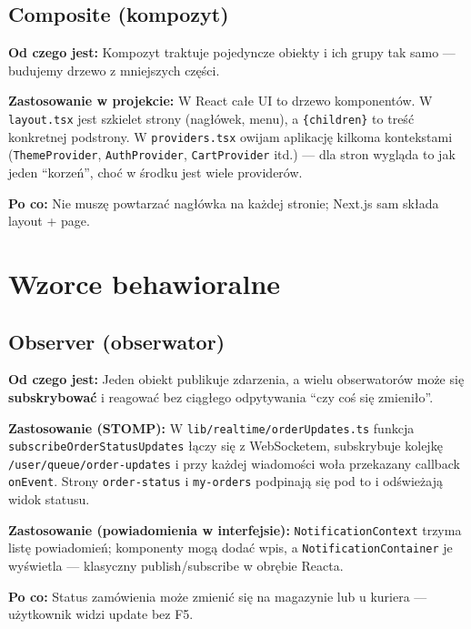 \documentclass[12pt,a4paper]{report}
\newenvironment{calosc}{%
  \Needspace{17\baselineskip}%
  \begin{samepage}%
}{%
  \end{samepage}%
}
\begin{document}
\begin{calosc}
\subsection{Composite (kompozyt)}

\textbf{Od czego jest:} Kompozyt traktuje pojedyncze obiekty i ich grupy tak samo --- budujemy drzewo z mniejszych części.

\textbf{Zastosowanie w projekcie:} W React całe UI to drzewo komponentów. W \texttt{layout.tsx} jest szkielet strony (nagłówek, menu), a \texttt{\{children\}} to treść konkretnej podstrony. W \texttt{providers.tsx} owijam aplikację kilkoma kontekstami (\texttt{ThemeProvider}, \texttt{AuthProvider}, \texttt{CartProvider} itd.) --- dla stron wygląda to jak jeden ``korzeń'', choć w środku jest wiele providerów.

\textbf{Po co:} Nie muszę powtarzać nagłówka na każdej stronie; Next.js sam składa layout + page.
\end{calosc}

\section{Wzorce behawioralne}

\begin{calosc}
\subsection{Observer (obserwator)}

\textbf{Od czego jest:} Jeden obiekt publikuje zdarzenia, a wielu obserwatorów może się \textbf{subskrybować} i reagować bez ciągłego odpytywania ``czy coś się zmieniło''.

\textbf{Zastosowanie (STOMP):} W \texttt{lib/realtime/orderUpdates.ts} funkcja \texttt{subscribeOrderStatusUpdates} łączy się z WebSocketem, subskrybuje kolejkę \texttt{/user/queue/order-updates} i przy każdej wiadomości woła przekazany callback \texttt{onEvent}. Strony \texttt{order-status} i \texttt{my-orders} podpinają się pod to i odświeżają widok statusu.

\textbf{Zastosowanie (powiadomienia w interfejsie):} \texttt{NotificationContext} trzyma listę powiadomień; komponenty mogą dodać wpis, a \texttt{NotificationContainer} je wyświetla --- klasyczny publish/subscribe w obrębie Reacta.

\textbf{Po co:} Status zamówienia może zmienić się na magazynie lub u kuriera --- użytkownik widzi update bez F5.
\end{calosc}
\end{document}
